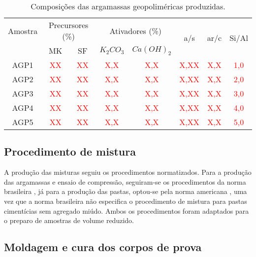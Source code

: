 \begin{table}[H]
    \caption{Composições das argamassas geopoliméricas produzidas.}
    \label{tab:composicoes_argamassas}
    \center
    \begin{tabular}{cccccccc}
    \hline
    Amostra & \multicolumn{2}{c}{Precursores (\%)} & \multicolumn{2}{c}{Ativadores (\%)} & \multirow{2}{*}{a/s} & \multirow{2}{*}{ar/c} & \multirow{2}{*}{Si/Al} \\
    \cline{2-5}
     & MK & SF & $K_2CO_3$ & $Ca(OH)_2$ & & \\
    \hline
     AGP1 & \textcolor{red}{XX} & \textcolor{red}{XX} & \textcolor{red}{X,X} & \textcolor{red}{X,X} & \textcolor{red}{X,XX} & \textcolor{red}{X,X} & \textcolor{red}{1,0} \\
    AGP2 & \textcolor{red}{XX} & \textcolor{red}{XX} & \textcolor{red}{X,X} & \textcolor{red}{X,X} & \textcolor{red}{X,XX} & \textcolor{red}{X,X} & \textcolor{red}{2,0} \\
    AGP3 & \textcolor{red}{XX} & \textcolor{red}{XX} & \textcolor{red}{X,X} & \textcolor{red}{X,X} & \textcolor{red}{X,XX} & \textcolor{red}{X,X} & \textcolor{red}{3,0} \\
    AGP4 & \textcolor{red}{XX} & \textcolor{red}{XX} & \textcolor{red}{X,X} & \textcolor{red}{X,X} & \textcolor{red}{X,XX} & \textcolor{red}{X,X} & \textcolor{red}{4,0} \\
    AGP5 & \textcolor{red}{XX} & \textcolor{red}{XX} & \textcolor{red}{X,X} & \textcolor{red}{X,X} & \textcolor{red}{X,XX} & \textcolor{red}{X,X} & \textcolor{red}{5,0} \\
    \hline
    \end{tabular}
\end{table}

\subsection{Procedimento de mistura}
\label{subsec:procedimento_de_mistura}

A produção das misturas seguiu os procedimentos normatizados.
Para a produção das argamassas e ensaio de compressão, seguiram-se os procedimentos da norma brasileira \cite{ABNT_NBR_7215_2019}, já para a produção das pastas, optou-se pela norma americana \cite{ASTM_C305_2006}, uma vez que a norma brasileira não especifica o procedimento de mistura para pastas cimentícias sem agregado miúdo.
Ambos os procedimentos foram adaptados para o preparo de amostras de volume reduzido.

\subsection{Moldagem e cura dos corpos de prova}
\label{subsec:moldagem_e_cura_dos_corpos_de_prova}

